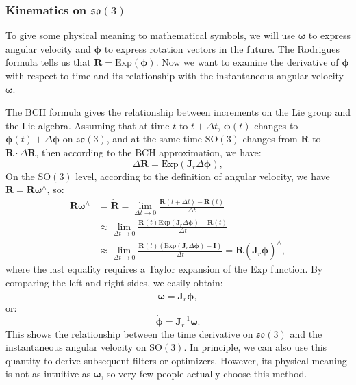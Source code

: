 \subsubsection{Kinematics on $\mathfrak{so}(3)$}
To give some physical meaning to mathematical symbols, we will use $\boldsymbol{\omega}$ to express angular velocity and $\boldsymbol{\phi}$ to express rotation vectors in the future. The Rodrigues formula tells us that $\mathbf{R} = \mathrm{Exp}(\boldsymbol{\phi})$. Now we want to examine the derivative of $\boldsymbol{\phi}$ with respect to time and its relationship with the instantaneous angular velocity $\boldsymbol{\omega}$.

The BCH formula gives the relationship between increments on the Lie group and the Lie algebra. Assuming that at time $t$ to $t+\Delta 
t$, $\boldsymbol{\phi}(t)$ changes to $\boldsymbol{\phi}(t) + \Delta 
\boldsymbol{\phi}$ on $\mathfrak{so}(3)$, and at the same time $\mathrm{SO}(3)$ changes from $\mathbf{R}$ to $\mathbf{R} \cdot \Delta 
\mathbf{R}$, then according to the BCH approximation, we have:
\begin{equation}\label{key}
	\Delta \mathbf{R} = \mathrm{Exp}( \mathbf{J}_r \Delta \boldsymbol{\phi}),
\end{equation}
On the $\mathrm{SO}(3)$ level, according to the definition of angular velocity, we have $\dot{\mathbf{R}} = \mathbf{R} 
\boldsymbol{\omega}^\wedge$, so:
\begin{equation}\label{key}
	\begin{array}{ll}
		\mathbf{R}\boldsymbol{\omega}^\wedge &= \dot{\mathbf{R}} = \mathop {\lim }\limits_{\Delta t \to 0} 
		\frac{{\mathbf{R}\left( {t + \Delta t} \right) - \mathbf{R}\left( t \right)}}{{\Delta t}}\\
		&\approx \mathop {\lim }\limits_{\Delta t \to 0} \frac{{\mathbf{R}\left( t \right)\mathrm{Exp}\left( 
				{{\mathbf{J}_r}\Delta \boldsymbol{\phi} } \right) - \mathbf{R}\left( t \right)}}{{\Delta t}}\\
		&\approx \mathop {\lim }\limits_{\Delta t \to 0} \frac{{\mathbf{R}\left( t \right)\left( {\mathrm{Exp}\left( 
					{{\mathbf{J}_r}\Delta \boldsymbol{\phi} } \right) - \mathbf{I}} \right)}}{{\Delta t}} = \mathbf{R} (\mathbf{J}_r \dot{\boldsymbol{\phi}})^\wedge,
	\end{array}
\end{equation}
where the last equality requires a Taylor expansion of the $\mathrm{Exp}$ function. By comparing the left and right sides, we easily obtain:
\begin{equation}
	\boldsymbol{\omega} = \mathbf{J}_r \dot{\boldsymbol{\phi}},
\end{equation}
or:
\begin{equation}\label{key}
	\dot{\boldsymbol{\phi}} = \mathbf{J}_r^{-1} \boldsymbol{\omega}.
\end{equation}
This shows the relationship between the time derivative on $\mathfrak{so}(3)$ and the instantaneous angular velocity on $\mathrm{SO}(3)$. In principle, we can also use this quantity to derive subsequent filters or optimizers. However, its physical meaning is not as intuitive as $\boldsymbol{\omega}$, so very few people actually choose this method.

